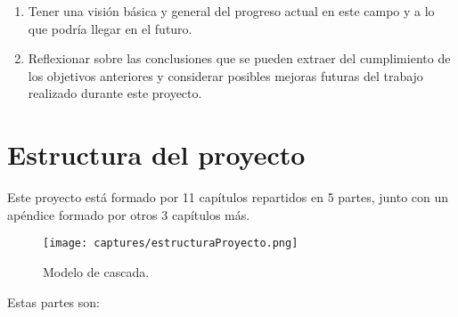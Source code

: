 \documentclass[11pt,fleqn]{book} %
\begin{document}
\begin{enumerate}
	\item Tener una visión básica y general del progreso actual en este campo y a lo que podría llegar en el futuro. \\
	
	\item Reflexionar sobre las conclusiones que se pueden extraer del cumplimiento de los objetivos anteriores y considerar posibles mejoras futuras del trabajo realizado durante este proyecto.
\end{enumerate}

\section{Estructura del proyecto}\label{sec:planificacion}

Este proyecto está formado por 11 capítulos repartidos en 5 partes, junto con un apéndice formado por otros 3 capítulos más.

\begin{figure}[H]
	\centering\texttt{[image: captures/estructuraProyecto.png]}
	\caption{Modelo de cascada.}
	\label{fig:estructuraProyecto} %
\end{figure}

Estas partes son: \\
\end{document}

